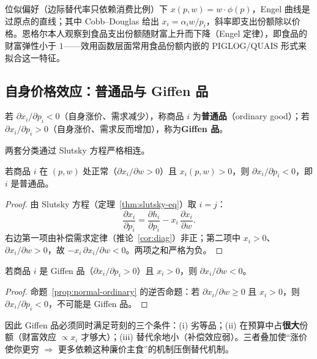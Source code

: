 \begin{remark}
位似偏好（边际替代率只依赖消费比例）下 $x(p,w)=w\cdot\phi(p)$，Engel 曲线是过原点的直线；其中 Cobb--Douglas 给出 $x_i=\alpha_i w/p_i$，斜率即支出份额除以价格。恩格尔本人观察到食品支出份额随财富上升而下降（Engel 定律），即食品的财富弹性小于 $1$——效用函数层面常用食品份额内嵌的 PIGLOG/QUAIS 形式来拟合这一特征。
\end{remark}

\subsection{自身价格效应：普通品与 Giffen 品}

\begin{definition}
若 $\partial x_i/\partial p_i<0$（自身涨价、需求减少），称商品 $i$ 为\textbf{普通品}（ordinary good）；若 $\partial x_i/\partial p_i>0$（自身涨价、需求反而增加），称为\textbf{Giffen 品}。
\end{definition}

两套分类通过 Slutsky 方程严格相连。

\begin{proposition}[正常品必为普通品]\label{prop:normal-ordinary}
若商品 $i$ 在 $(p,w)$ 处正常（$\partial x_i/\partial w>0$）且 $x_i(p,w)>0$，则 $\partial x_i/\partial p_i<0$，即 $i$ 是普通品。
\end{proposition}
\begin{proof}
由 Slutsky 方程（定理~\ref{thm:slutsky-eq}）取 $i=j$：
\[
 \frac{\partial x_i}{\partial p_i}
 =\frac{\partial h_i}{\partial p_i}-x_i\,\frac{\partial x_i}{\partial w}.
\]
右边第一项由补偿需求定律（推论~\ref{cor:diag}）非正；第二项中 $x_i>0$、$\partial x_i/\partial w>0$，故 $-x_i\,\partial x_i/\partial w<0$。两项之和严格为负。
\end{proof}

\begin{corollary}
若商品 $i$ 是 Giffen 品（$\partial x_i/\partial p_i>0$）且 $x_i>0$，则 $\partial x_i/\partial w<0$。
\end{corollary}
\begin{proof}
命题~\ref{prop:normal-ordinary} 的逆否命题：若 $\partial x_i/\partial w\ge0$ 且 $x_i>0$，则 $\partial x_i/\partial p_i<0$，不可能是 Giffen 品。
\end{proof}

因此 Giffen 品必须同时满足苛刻的三个条件：(i) 劣等品；(ii) 在预算中占\textbf{很大}份额（财富效应 $\propto x_i$ 才够大）；(iii) 替代余地小（补偿效应弱）。三者叠加使“涨价使你更穷 $\Rightarrow$ 更多依赖这种廉价主食”的机制压倒替代机制。

